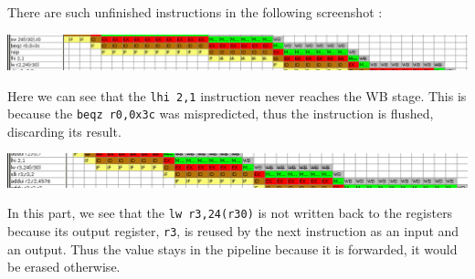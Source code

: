 \documentclass[a4paper]{report}
\begin{document}
There are such unfinished instructions in the following screenshot :

\begin{center}
	\includegraphics[width=\textwidth-2cm]{images/pipeline_no_writeback_after_branching.png}
\end{center}

Here we can see that the \texttt{lhi 2,1} instruction never reaches the WB stage. This is because the
\texttt{beqz~r0,0x3c} was mispredicted, thus the instruction is flushed, discarding its result.

\begin{center}
	\includegraphics[width=\textwidth-2cm]{images/pipeline_no_writeback_after_forwarding.png}
\end{center}

In this part, we see that the \texttt{lw~r3,24(r30)} is not written back to the registers because its output
register, \texttt{r3}, is reused by the next instruction as an input and an output. Thus the value stays in
the pipeline because it is forwarded, it would be erased otherwise.
\mbox{}\\
\end{document}
